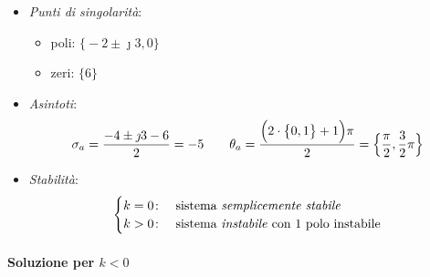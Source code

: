 \begin{esercizio}
\begin{itemize}
	\item \emph{Punti di singolarità}:
		\begin{itemize}
			\item poli: \(\bigl\{-2\pm\jmath3,0\bigr\}\)
			\item zeri: \(\bigl\{6\bigr\}\)
		\end{itemize}
	\item \emph{Asintoti}:
		\[
			\sigma_a = \frac{-4\pm\jmath3-6}{2} = -5 \qquad
			\theta_a = \frac{\Bigl(2\cdot\bigl\{0,1\bigr\}+1\Bigr)\pi}{2} = \Bigl\{\frac{\pi}{2},\frac{3}{2}\pi\Bigr\}
		\]
	\item \emph{Stabilità}:
		\[\begin{cases}
			k=0\colon & \text{sistema \emph{semplicemente stabile}} \\
			k>0\colon & \text{sistema \emph{instabile} con 1 polo instabile}
		\end{cases}\]
\end{itemize}

\paragraph{Soluzione per \(k<0\)}


\end{esercizio}
